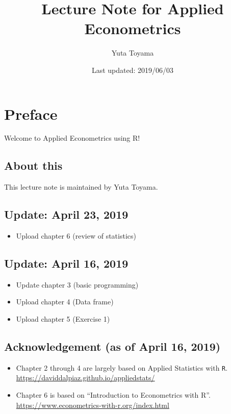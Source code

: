 \documentclass[]{book}
\title{Lecture Note for Applied Econometrics}
\author{Yuta Toyama}
\date{Last updated: 2019/06/03}
\providecommand{\tightlist}{%
  \setlength{\itemsep}{0pt}\setlength{\parskip}{0pt}}
\begin{document}
\maketitle

{
\setcounter{tocdepth}{1}
\tableofcontents
}
\chapter{Preface}\label{preface}

Welcome to Applied Econometrics using R!

\section{About this}\label{about-this}

This lecture note is maintained by Yuta Toyama.

\section{Update: April 23, 2019}\label{update-april-23-2019}

\begin{itemize}
\tightlist
\item
  Upload chapter 6 (review of statistics)
\end{itemize}

\section{Update: April 16, 2019}\label{update-april-16-2019}

\begin{itemize}
\tightlist
\item
  Update chapter 3 (basic programming)
\item
  Upload chapter 4 (Data frame)
\item
  Upload chapter 5 (Exercise 1)
\end{itemize}

\section{Acknowledgement (as of April 16,
2019)}\label{acknowledgement-as-of-april-16-2019}

\begin{itemize}
\tightlist
\item
  Chapter 2 through 4 are largely based on Applied Statistics with
  \texttt{R}. \url{https://daviddalpiaz.github.io/appliedstats/}
\item
  Chapter 6 is based on ``Introduction to Econometrics with R''.
  \url{https://www.econometrics-with-r.org/index.html}
\end{itemize}
\end{document}
